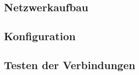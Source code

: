 \subsection{Netzwerkaufbau}

\clearpage
\pagebreak
\subsection{Konfiguration}

\clearpage
\pagebreak
\subsection{Testen der Verbindungen}

\clearpage
\pagebreak